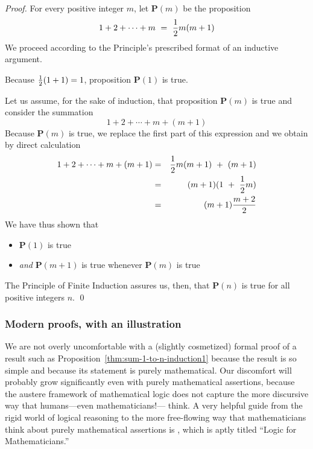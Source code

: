 \begin{proof}
For every positive integer $m$, let {\bf P}$(m)$ be the proposition
\[  1 + 2 + \cdots + m \ = \ {1 \over 2} m(m+1) \]
We proceed according to the Principle's prescribed format of an
inductive argument.

Because ${1 \over 2}(1+1) = 1$, proposition {\bf P}$(1)$ is true.

Let us assume, for the sake of induction, that proposition
{\bf P}$(m)$ is true and consider the summation
\[ 1 + 2 + \cdots + m + (m+1) \]
Because {\bf P}$(m)$ is true, we replace the first part of this expression
and we obtain by direct calculation
\begin{eqnarray*}
1 + 2 + \cdots + m + (m+1)
  & = & {1 \over 2} m(m+1) \ + \ (m+1) \\
  & = & (m+1) ( 1 \ + \ {1 \over 2} m ) \\
  & = & (m+1)\frac{m+2}{2} 
\end{eqnarray*}
We have thus shown that
\begin{itemize}
\item
{\bf P}$(1)$ is true
\item
{\em and}
{\bf P}$(m+1)$ is true whenever {\bf P}$(m)$ is true
\end{itemize}
The Principle of Finite Induction assures us, then, that {\bf P}$(n)$
is true for all positive integers $n$.  \qed
\end{proof}


\subsubsection{Modern proofs, with an illustration}
\label{sec:modern-proof}

We are not overly uncomfortable with a (slightly cosmetized) formal
proof of a result such as Proposition~\ref{thm:sum-1-to-n-induction1}
because the result is so simple and because its statement is purely
mathematical.  Our discomfort will probably grow significantly even
with purely mathematical assertions, because the austere framework of
mathematical logic does not capture the more discursive way that
humans---even mathematicians!--- think.  A very helpful guide from the
rigid world of logical reasoning to the more free-flowing way that
mathematicians think about purely mathematical assertions is
\cite{Rosser53}, which is aptly titled ``Logic for Mathematicians.''

